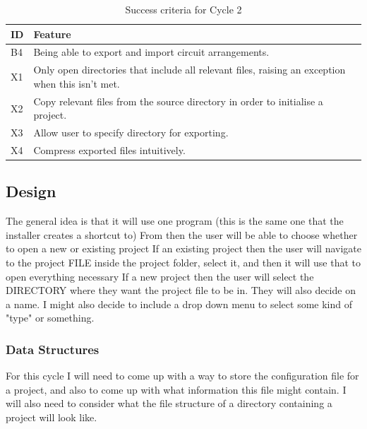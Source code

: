 \documentclass[11pt]{article}
\begin{document}
                \begin{table}[!ht]
                    \centering
                    \begin{tabular}{m{16pt}m{}}
                        ID & Feature \\ \hline
                        B4 & Being able to export and import circuit arrangements. \\ 
                        X1 & Only open directories that include all relevant files, raising an exception when this isn't met. \\ 
                        X2 & Copy relevant files from the source directory in order to initialise a project. \\ 
                        X3 & Allow user to specify directory for exporting. \\ 
                        X4 & Compress exported files intuitively. \\ 
                    \end{tabular}
                    \caption{Success criteria for Cycle 2}
                    \label{tbl:succ_crit_c2}
                \end{table}


        \subsection{Design}
            The general idea is that it will use one program (this is the same one that the installer creates a shortcut to)
            From then the user will be able to choose whether to open a new or existing project
            If an existing project then the user will navigate to the project FILE inside the project folder, select it, and then it will use that to open everything necessary
            If a new project then the user will select the DIRECTORY where they want the project file to be in. They will also decide on a name. I might also decide to include a drop down menu to select some kind of "type" or something.

            \subsubsection{Data Structures}
                For this cycle I will need to come up with a way to store the configuration file for a project, and also to come up with what information this file might contain. I will also need to consider what the file structure of a directory containing a project will look like. 
\end{document}
